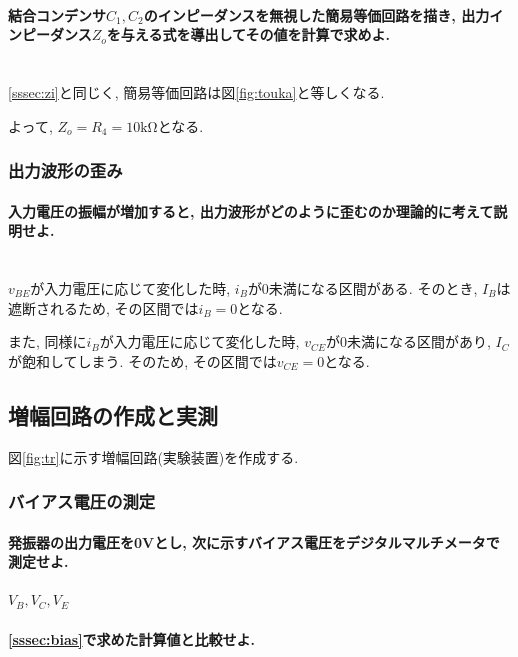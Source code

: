 \documentclass[titlepage]{jsarticle}
\begin{document}
            \paragraph{結合コンデンサ$C_1, C_2$のインピーダンスを無視した簡易等価回路を描き, 出力インピーダンス$Z_o$を与える式を導出してその値を計算で求めよ.}
            \mbox{} \\

                \ref{sssec:zi}と同じく, 簡易等価回路は図\ref{fig:touka}と等しくなる.

                よって, $Z_o = R_4 = 10 \mathrm{k\Omega}$となる.

        \subsubsection{出力波形の歪み} \label{sssec:distortion}
            \paragraph{入力電圧の振幅が増加すると, 出力波形がどのように歪むのか理論的に考えて説明せよ.}
            \mbox{} \\
                
                $v_{BE}$が入力電圧に応じて変化した時, $i_B$が0未満になる区間がある.
                そのとき, $I_B$は遮断されるため, その区間では$i_B = 0$となる.

                また, 同様に$i_B$が入力電圧に応じて変化した時, $v_{CE}$が0未満になる区間があり,
                $I_C$が飽和してしまう. そのため, その区間では$v_{CE} = 0$となる.

    \subsection{増幅回路の作成と実測}
        図\ref{fig:tr}に示す増幅回路(実験装置)を作成する.

        \subsubsection{バイアス電圧の測定}
            \paragraph{発振器の出力電圧を0Vとし, 次に示すバイアス電圧をデジタルマルチメータで測定せよ.} $V_B, V_C, V_E$
            \paragraph{\ref{sssec:bias}で求めた計算値と比較せよ.}
            \mbox{} \\
\end{document}
